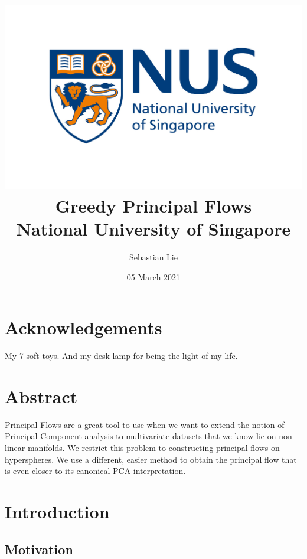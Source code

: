 \documentclass[12pt]{report}
\begin{document}
\title{
{\includegraphics[width=0.7\columnwidth]{university.jpg}}\\
{Greedy Principal Flows}\\
{\large National University of Singapore}\\
}
\author{Sebastian Lie}
\date{05 March 2021}
\maketitle

\chapter*{Acknowledgements}
My 7 soft toys. And my desk lamp for being the light of my life.

\chapter*{Abstract}
Principal Flows are a great tool to use when we want to extend the 
notion of Principal Component analysis to multivariate datasets that 
we know lie on non-linear manifolds. 
We restrict this problem to constructing principal flows on hyperspheres. 
We use a different, easier method to obtain the principal flow 
that is even closer to its canonical PCA interpretation. 

\newpage
\tableofcontents
\newpage

\chapter{Introduction}

\section{Motivation}
\end{document}
